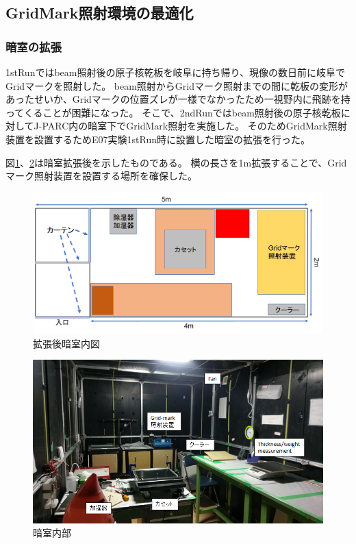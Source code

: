 \documentclass[12pt,a4paper]{jarticle}
\begin{document}
\subsection{GridMark照射環境の最適化}
\subsubsection{暗室の拡張}
1stRunではbeam照射後の原子核乾板を岐阜に持ち帰り、現像の数日前に岐阜でGridマークを照射した。
beam照射からGridマーク照射までの間に乾板の変形があったせいか、Gridマークの位置ズレが一様でなかったため一視野内に飛跡を持ってくることが困難になった。
そこで、2ndRunではbeam照射後の原子核乾板に対してJ-PARC内の暗室下でGridMark照射を実施した。
そのためGridMark照射装置を設置するためE07実験1stRun時に設置した暗室の拡張を行った。
\par
図\ref{fig:darkroom_mosikizu}、\ref{fig:darkroom_view}は暗室拡張後を示したものである。
横の長さを1m拡張することで、Gridマーク照射装置を設置する場所を確保した。
\begin{figure}[htbp]
  \centering
    \includegraphics[width=120mm]{darkroom_after.png}
  \caption{拡張後暗室内図\label{fig:darkroom_mosikizu}}
\end{figure}
\begin{figure}[htbp]
  \centering
    \includegraphics[width=120mm]{darkroom_view.png}
  \caption{暗室内部\label{fig:darkroom_view}}
\end{figure}
\end{document}
